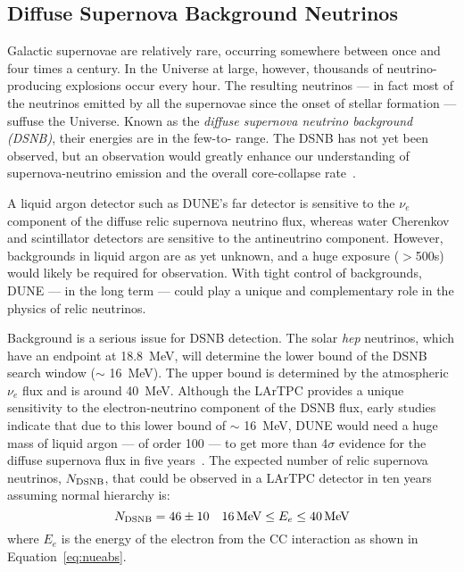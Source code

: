 \subsection{Diffuse Supernova Background Neutrinos}

Galactic supernovae are relatively rare, occurring somewhere between
once and four times a century. In the Universe
at large, however, thousands of neutrino-producing explosions occur
every hour.  The resulting neutrinos --- in fact most of the neutrinos
emitted by all the supernovae since the onset of stellar formation ---
suffuse the Universe.  Known as the \emph{diffuse supernova neutrino background
  (DSNB)}, their energies are in the few-to- range.  The DSNB
has not yet been observed, but an observation would greatly enhance
our understanding of supernova-neutrino emission and the overall
core-collapse rate~\cite{Beacom:2010kk}.


A liquid argon detector such as DUNE's far detector is sensitive to
the $\nu_e$ component of the diffuse relic supernova neutrino flux,
whereas water Cherenkov and scintillator detectors are sensitive to
the antineutrino component.  However, backgrounds in liquid argon are as
yet unknown, and a huge exposure ($>$\SI{500}{\ktyr}s)
would likely be required for observation.  
With tight control of
backgrounds, 
DUNE --- in the long term --- could play a unique and
 complementary role in the physics of relic neutrinos.


Background is a serious issue for DSNB detection.
The solar {\em hep} neutrinos, which have an                
endpoint at \SI{18.8}{\MeV}, will determine the lower bound of the DSNB
search window ($\sim$ \SI{16}{\MeV}).  The upper bound is determined
by the atmospheric ${\nu}_{e}$ flux and
is around \SI{40}{MeV}.
Although the LArTPC provides a unique sensitivity to the
electron-neutrino component of the DSNB flux, early studies indicate
that due to this lower bound of $\sim$ \SI{16}{\MeV}, DUNE would need a huge
mass of liquid argon --- of order \SI{100}{\kt} --- to get more than 4$\sigma$
evidence for the diffuse supernova flux in five
years~\cite{Cocco:2004ac}.
%
The expected number of relic
supernova neutrinos, $N_{\rm DSNB}$, that could be observed in a
 LArTPC detector in ten years~\cite{Cocco:2004ac}
assuming normal hierarchy is:
\begin{equation}
N_{\rm DSNB} = 46 \pm 10  \ \ \ 16 \, {\rm MeV} \leq E_e \leq 40 \, {\rm MeV}
\label{eqn:srnrate}
\end{equation}
where $E_e$ is the energy of the electron from the CC interaction as
shown in Equation~\ref{eq:nueabs}. 

